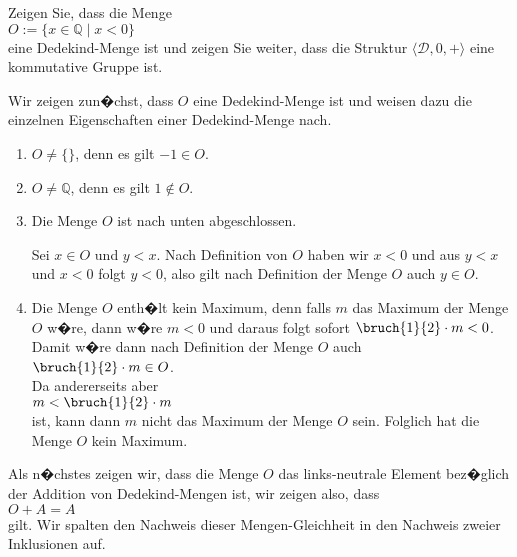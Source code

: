 \exercise
Zeigen Sie, dass die Menge 
\\[0.2cm]
\hspace*{1.3cm}
$O := \{ x \in \mathbb{Q} \mid x < 0 \}$
\\[0.2cm]
eine Dedekind-Menge ist und zeigen Sie weiter, dass die Struktur $\langle \mathcal{D}, 0, + \rangle$
eine kommutative Gruppe ist.
\eox

\solution
Wir zeigen zun�chst, dass $O$ eine Dedekind-Menge ist und weisen dazu die einzelnen Eigenschaften einer
Dedekind-Menge nach. 
\begin{enumerate}
\item $O \not= \{\}$, denn es gilt $-1 \in O$.
\item $O \not= \mathbb{Q}$, denn es gilt $1 \not\in O$.
\item Die Menge $O$ ist nach unten abgeschlossen.

      Sei $x \in O$ und $y < x$.  Nach Definition von $O$ haben wir
      $x < 0$ und aus $y < x$ und $x < 0$ folgt $y < 0$, also gilt nach Definition der Menge $O$ 
      auch $y \in O$.
\item Die Menge $O$ enth�lt kein Maximum, denn falls $m$ das Maximum der Menge $O$ w�re,
      dann w�re $m < 0$ und daraus folgt sofort $\bruch{1}{2} \cdot m < 0$.  Damit w�re dann nach
      Definition der Menge $O$ auch
      \\[0.2cm]
      \hspace*{1.3cm}
      $\bruch{1}{2} \cdot m \in O$.
      \\[0.2cm]
      Da andererseits aber
      \\[0.2cm]
      \hspace*{1.3cm}
      $m < \bruch{1}{2} \cdot m$
      \\[0.2cm]
      ist, kann dann $m$ nicht das Maximum der Menge $O$ sein.   Folglich hat die Menge $O$ kein Maximum.
\end{enumerate}
\renewcommand{\labelenumi}{\arabic{enumi}.}
Als n�chstes zeigen wir, dass die Menge $O$ das links-neutrale Element bez�glich der Addition von
Dedekind-Mengen ist, wir zeigen also, dass
\\[0.2cm]
\hspace*{1.3cm}
$O + A = A$
\\[0.2cm]
gilt.  Wir spalten den Nachweis dieser Mengen-Gleichheit in den Nachweis zweier Inklusionen auf.
